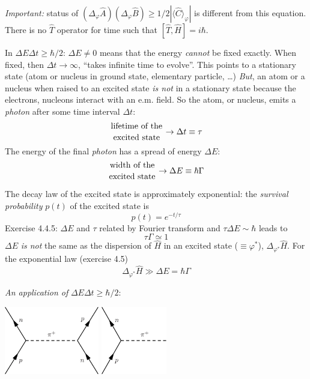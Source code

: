 \documentclass[12pt]{article}
\newcommand{\be}{\begin{equation}}
\newcommand{\ee}{\end{equation}}
\begin{document}
\emph{Important:} status of $\left(\Delta_{\varphi} \hat{A}\right)\left(\Delta_{\varphi} \hat{B}\right) \geqslant 1/2 |\langle\hat{C}\rangle_{\varphi}|$
is different from this equation. There is no
$\hat{T}$ operator for time such that
$[\hat{T},\hat{H}] = i\hbar$.

In $\Delta E \Delta t \geq \hbar / 2$: $\Delta E \neq 0$ means that the energy
\emph{cannot} be fixed exactly. When fixed,
then $\Delta t \to \infty$, ``takes infinite time
to evolve''. This points to a stationary state (atom or
nucleus in ground state, elementary particle, \ldots)
\emph{But}, an atom or a nucleus when raised
to an excited state \emph{is not} in a stationary
state because the electrons, nucleons
interact with an e.m. field.
So the atom, or nucleus, emits a \emph{photon}
after some time interval $\Delta t$:
\be
{{\text{lifetime of the}}\atop{\text{excited state}}} \to \Delta t \equiv \tau
\ee
The energy of the final \emph{photon} has
a spread of energy $\Delta E$:
\be
{{\text{width of the}}\atop{\text{excited state}}} \to \Delta E \equiv \hbar \Gamma
\ee


The decay law of the excited state is approximately
exponential: the \emph{survival probability} $p(t)$
of the excited state is
\be
p(t)=e^{-t / \tau}
\ee
Exercise 4.4.5: $\Delta E$ and $\tau$ related by Fourier
transform and $\tau\Delta E \sim \hbar$ leads to
\be
\tau \Gamma \simeq 1
\ee
$\Delta E$ \emph{is not} the same as the dispersion of $\hat{H}$
in an excited state ($\equiv \varphi^*$), $\Delta_{\varphi^*} \hat{H}$.
For the exponential law (exercise 4.5)
\be
\Delta_{\varphi^*} \hat{H} \gg \Delta E=\hbar \Gamma
\ee

\emph{An application of} $\Delta E \Delta t \geqslant \hbar / 2$: 

\begin{center}
\includegraphics[height=8em]{Figures/np-piplus-pn.pdf}\quad\quad%
\includegraphics[height=8em]{Figures/np-piplus.pdf}
\end{center}
\end{document}
